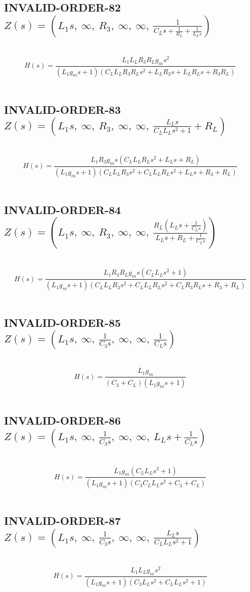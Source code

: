 \documentclass{article}
\begin{document}
\subsection{INVALID-ORDER-82 $Z(s) = \left( L_{1} s, \  \infty, \  R_{3}, \  \infty, \  \infty, \  \frac{1}{C_{L} s + \frac{1}{R_{L}} + \frac{1}{L_{L} s}}\right)$ } \ 
\textbf{\[H(s) = \frac{L_{1} L_{L} R_{3} R_{L} g_{m} s^{2}}{\left(L_{1} g_{m} s + 1\right) \left(C_{L} L_{L} R_{3} R_{L} s^{2} + L_{L} R_{3} s + L_{L} R_{L} s + R_{3} R_{L}\right)}\] } \ 
\subsection{INVALID-ORDER-83 $Z(s) = \left( L_{1} s, \  \infty, \  R_{3}, \  \infty, \  \infty, \  \frac{L_{L} s}{C_{L} L_{L} s^{2} + 1} + R_{L}\right)$ } \ 
\textbf{\[H(s) = \frac{L_{1} R_{3} g_{m} s \left(C_{L} L_{L} R_{L} s^{2} + L_{L} s + R_{L}\right)}{\left(L_{1} g_{m} s + 1\right) \left(C_{L} L_{L} R_{3} s^{2} + C_{L} L_{L} R_{L} s^{2} + L_{L} s + R_{3} + R_{L}\right)}\] } \ 
\subsection{INVALID-ORDER-84 $Z(s) = \left( L_{1} s, \  \infty, \  R_{3}, \  \infty, \  \infty, \  \frac{R_{L} \left(L_{L} s + \frac{1}{C_{L} s}\right)}{L_{L} s + R_{L} + \frac{1}{C_{L} s}}\right)$ } \ 
\textbf{\[H(s) = \frac{L_{1} R_{3} R_{L} g_{m} s \left(C_{L} L_{L} s^{2} + 1\right)}{\left(L_{1} g_{m} s + 1\right) \left(C_{L} L_{L} R_{3} s^{2} + C_{L} L_{L} R_{L} s^{2} + C_{L} R_{3} R_{L} s + R_{3} + R_{L}\right)}\] } \ 
\subsection{INVALID-ORDER-85 $Z(s) = \left( L_{1} s, \  \infty, \  \frac{1}{C_{3} s}, \  \infty, \  \infty, \  \frac{1}{C_{L} s}\right)$ } \ 
\textbf{\[H(s) = \frac{L_{1} g_{m}}{\left(C_{3} + C_{L}\right) \left(L_{1} g_{m} s + 1\right)}\] } \ 
\subsection{INVALID-ORDER-86 $Z(s) = \left( L_{1} s, \  \infty, \  \frac{1}{C_{3} s}, \  \infty, \  \infty, \  L_{L} s + \frac{1}{C_{L} s}\right)$ } \ 
\textbf{\[H(s) = \frac{L_{1} g_{m} \left(C_{L} L_{L} s^{2} + 1\right)}{\left(L_{1} g_{m} s + 1\right) \left(C_{3} C_{L} L_{L} s^{2} + C_{3} + C_{L}\right)}\] } \ 
\subsection{INVALID-ORDER-87 $Z(s) = \left( L_{1} s, \  \infty, \  \frac{1}{C_{3} s}, \  \infty, \  \infty, \  \frac{L_{L} s}{C_{L} L_{L} s^{2} + 1}\right)$ } \ 
\textbf{\[H(s) = \frac{L_{1} L_{L} g_{m} s^{2}}{\left(L_{1} g_{m} s + 1\right) \left(C_{3} L_{L} s^{2} + C_{L} L_{L} s^{2} + 1\right)}\] } \ 
\end{document}
